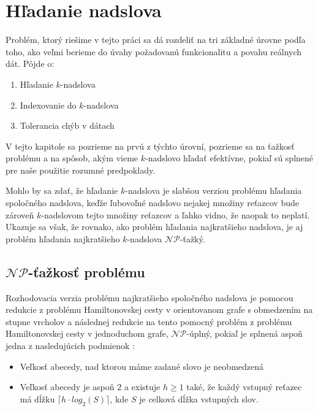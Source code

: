 \chapter{Hľadanie nadslova}

Problém, ktorý riešime v tejto práci sa dá rozdeliť na tri základné úrovne podľa toho,
ako veľmi berieme do úvahy požadovanú funkcionalitu a povahu reálnych dát. Pôjde o:
\begin{enumerate}
    \item Hľadanie $k$-nadslova
    \item Indexovanie do $k$-nadslova
    \item Tolerancia chýb v dátach
\end{enumerate}
V tejto kapitole sa pozrieme na prvú z týchto úrovní, pozrieme sa na ťažkosť problému
a na spôsob, akým vieme $k$-nadslovo hľadať efektívne, pokiaľ sú splnené pre naše
použitie rozumné predpoklady.

Mohlo by sa zdať, že hľadanie $k$-nadslova je slabšou verziou problému hľadania
spoločného nadslova, keďže ľubovoľné nadslovo nejakej množiny reťazcov bude zároveň
$k$-nadslovom tejto množiny reťazcov a ľahko vidno, že naopak to neplatí.
Ukazuje sa však, že rovnako, ako problém hľadania najkratšieho nadslova, je aj
problém hľadania najkratšieho $k$-nadslova $\mathcal{NP}$-ťažký.

\section{$\mathcal{NP}$-ťažkosť problému}

Rozhodovacia verzia problému najkratšieho spoločného nadslova je pomocou redukcie
z problému Hamiltonovskej cesty v orientovanom grafe s obmedzením na stupne vrcholov
a následnej redukcie na tento pomocný problém z problému Hamiltonovskej cesty v jednoduchom
grafe, $\mathcal{NP}$-úplný, pokiaľ je splnená aspoň jedna z nasledujúcich podmienok \cite{superstring}:
\begin{itemize}
    \item Veľkosť abecedy, nad ktorou máme zadané slovo je neobmedzená
    \item Veľkosť abecedy je aspoň $2$ a existuje $h \ge 1$ také, že každý
          vstupný reťazec má dĺžku $\lceil h \cdot log_2 (S) \rceil$, kde $S$
          je celková dĺžka vstupných slov.
\end{itemize}

